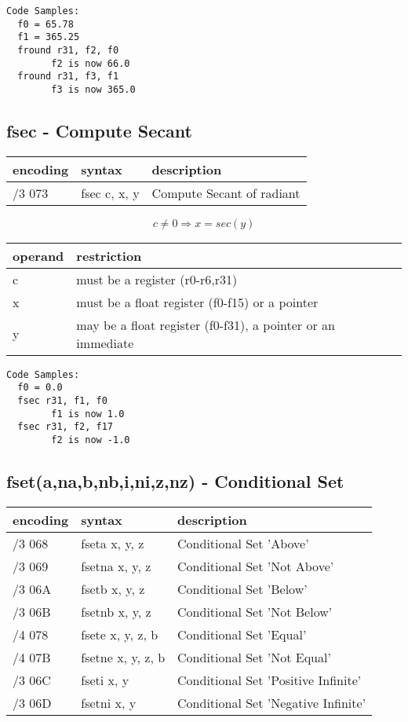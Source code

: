 \documentclass[letterpaper,10pt,openright,twoside,onecolumn]{book}
\begin{document}
  \begin{verbatim}
Code Samples:
  f0 = 65.78
  f1 = 365.25
  fround r31, f2, f0
        f2 is now 66.0
  fround r31, f3, f1
        f3 is now 365.0
  \end{verbatim}
\newpage\subsection{fsec - Compute Secant}
  \begin{tabular}{|l|l|l|}
   \hline
    encoding & syntax & description \\
   \hline
    /3 073 & fsec c, x, y & Compute Secant of radiant\\
   \hline
  \end{tabular}

  \begin{displaymath} c \neq 0 \Rightarrow x = sec(y)\end{displaymath}

  \flushleft
  \begin{tabular}{|l|l|}
   \hline
    operand & restriction \\
   \hline
    c & must be a register (r0-r6,r31) \\
    x & must be a float register (f0-f15) or a pointer \\
    y & may be a float register (f0-f31), a pointer or an immediate \\
   \hline
  \end{tabular}

  \begin{verbatim}
Code Samples:
  f0 = 0.0
  fsec r31, f1, f0
        f1 is now 1.0
  fsec r31, f2, f17
        f2 is now -1.0
  \end{verbatim}
\newpage\subsection{fset(a,na,b,nb,i,ni,z,nz) - Conditional Set}
  \begin{tabular}{|l|l|l|}
   \hline
    encoding & syntax & description \\
   \hline
    /3 068 & fseta x, y, z & Conditional Set 'Above' \\
    /3 069 & fsetna x, y, z & Conditional Set 'Not Above' \\
    /3 06A & fsetb x, y, z & Conditional Set 'Below' \\
    /3 06B & fsetnb x, y, z & Conditional Set 'Not Below' \\
    /4 078 & fsete x, y, z, b & Conditional Set 'Equal' \\
    /4 07B & fsetne x, y, z, b & Conditional Set 'Not Equal' \\
    /3 06C & fseti x, y & Conditional Set 'Positive Infinite' \\
    /3 06D & fsetni x, y & Conditional Set 'Negative Infinite' \\
   \hline
  \end{tabular}
\end{document}
